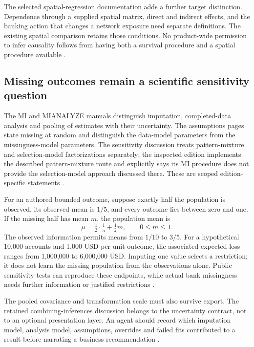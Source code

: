The selected spatial-regression documentation adds a further target
distinction. Dependence through a supplied spatial matrix, direct and
indirect effects, and the banking action that changes a network exposure
need separate definitions. The existing spatial comparison retains those
conditions. No product-wide permission to infer causality follows from
having both a survival procedure and a spatial procedure available
\citep{exec20_network_sas_latest_spatial,exec24_sas_choice}.

\subsection{Missing outcomes remain a scientific sensitivity question}
The MI and MIANALYZE manuals distinguish imputation, completed-data analysis
and pooling of estimates with their uncertainty. The assumptions pages
state missing at random and distinguish the data-model parameters from
the missingness-model parameters. The sensitivity discussion treats
pattern-mixture and selection-model factorizations separately; the
inspected edition implements the described pattern-mixture route and
explicitly says its MI procedure does not provide the selection-model
approach discussed there. These are scoped edition-specific statements
\citep{exec21_transport_sas_mi_intro,exec21_transport_sas_mianalyze_intro,
exec21_transport_sas_assumptions,exec21_transport_sas_sensitivity}.

For an authored bounded outcome, suppose exactly half the population is
observed, its observed mean is $1/5$, and every outcome lies between zero
and one. If the missing half has mean $m$, the population mean is
\[
 \mu=\tfrac12\cdot\tfrac15+\tfrac12m,
 \qquad 0\leq m\leq1.
\]
The observed information permits means from $1/10$ to $3/5$. For a
hypothetical 10,000 accounts and 1,000 USD per unit outcome, the associated
expected loss ranges from 1,000,000 to 6,000,000 USD. Imputing one value
selects a restriction; it does not learn the missing population from the
observations alone. Public sensitivity tests can reproduce these endpoints,
while actual bank missingness needs further information or justified
restrictions \citep{exec24_sas_choice}.

The pooled covariance and transformation scale must also survive export.
The retained combining-inferences discussion belongs to the uncertainty
contract, not to an optional presentation layer. An agent should record
which imputation model, analysis model, assumptions, overrides and failed
fits contributed to a result before narrating a business recommendation
\citep{exec21_transport_sas_combining,exec21_transport_sas_mianalyze_intro,
exec24_sas_choice}.

